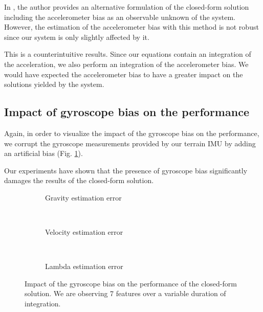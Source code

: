 \documentclass[letterpaper, 10 pt, conference]{ieeeconf}  %
\begin{document}
In \cite{Martinelli2014}, the author provides an alternative formulation of the closed-form solution including the accelerometer bias as an observable unknown of the system.
However, the estimation of the accelerometer bias with this method is not robust since our system is only slightly affected by it.

This is a counterintuitive results. Since our equations contain an integration of the acceleration, we also perform an integration of the accelerometer bias.
We would have expected the accelerometer bias to have a greater impact on the solutions yielded by the system.



\subsection{Impact of gyroscope bias on the performance}
Again, in order to visualize the impact of the gyroscope bias on the performance,
we corrupt the gyroscope measurements provided by our terrain IMU by adding an artificial bias (Fig. \ref{fig:biasGyroCF}).

Our experiments have shown that the presence of gyroscope bias significantly damages the results of the closed-form solution.

\begin{figure}[h!]
        \centering

        \begin{subfigure}[b]{0.5\columnwidth}
                \resizebox{\columnwidth}{!}{}
                \caption{Gravity estimation error}

        \end{subfigure}%
        ~ %
        \begin{subfigure}[b]{0.5\columnwidth}
                \resizebox{\columnwidth}{!}{}
                \caption{Velocity estimation error}

        \end{subfigure}
        ~ %
        \begin{subfigure}[b]{0.5\columnwidth}
                \resizebox{\columnwidth}{!}{}
                \caption{Lambda estimation error}

        \end{subfigure}
        \caption{Impact of the gyroscope bias on the performance of the closed-form solution. We are observing 7 features over a variable duration of integration. \label{fig:biasGyroCF}}
\end{figure}
\end{document}
